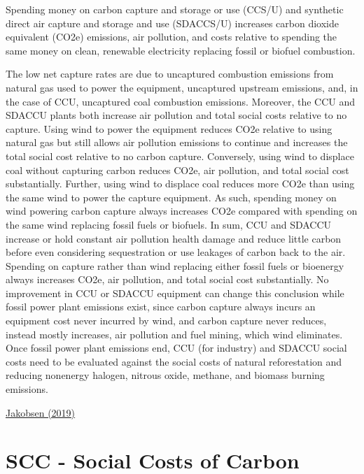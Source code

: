 \documentclass[
]{book}
\begin{document}
Spending money on carbon capture and storage or use (CCS/U) and synthetic direct air capture and storage and use (SDACCS/U) increases carbon dioxide equivalent (CO2e) emissions, air pollution, and costs relative to spending the same money on clean, renewable electricity replacing fossil or biofuel combustion.

The low net capture rates are due to uncaptured combustion emissions from natural gas used to power the equipment, uncaptured upstream emissions, and, in the case of CCU, uncaptured coal combustion emissions. Moreover, the CCU and SDACCU plants both increase air pollution and total social costs relative to no capture. Using wind to power the equipment reduces CO2e relative to using natural gas but still allows air pollution emissions to continue and increases the total social cost relative to no carbon capture. Conversely, using wind to displace coal without capturing carbon reduces CO2e, air pollution, and total social cost substantially. Further, using wind to displace coal reduces more CO2e than using the same wind to power the capture equipment. As such, spending money on wind powering carbon capture always increases CO2e compared with spending on the same wind replacing fossil fuels or biofuels. In sum, CCU and SDACCU increase or hold constant air pollution health damage and reduce little carbon before even considering sequestration or use leakages of carbon back to the air. Spending on capture rather than wind replacing either fossil fuels or bioenergy always increases CO2e, air pollution, and total social cost substantially. No improvement in CCU or SDACCU equipment can change this conclusion while fossil power plant emissions exist, since carbon capture always incurs an equipment cost never incurred by wind, and carbon capture never reduces, instead mostly increases, air pollution and fuel mining, which wind eliminates. Once fossil power plant emissions end, CCU (for industry) and SDACCU social costs need to be evaluated against the social costs of natural reforestation and reducing nonenergy halogen, nitrous oxide, methane, and biomass burning emissions.

\href{https://research.american.edu/carbonremoval/2019/11/13/jacobson-mark-2019-why-carbon-capture-and-direct-air-capture-cause-more-damage-than-good-to-climate-and-health/}{Jakobsen (2019)}

\hypertarget{scc---social-costs-of-carbon}{%
\chapter{SCC - Social Costs of Carbon}\label{scc---social-costs-of-carbon}}
\end{document}
